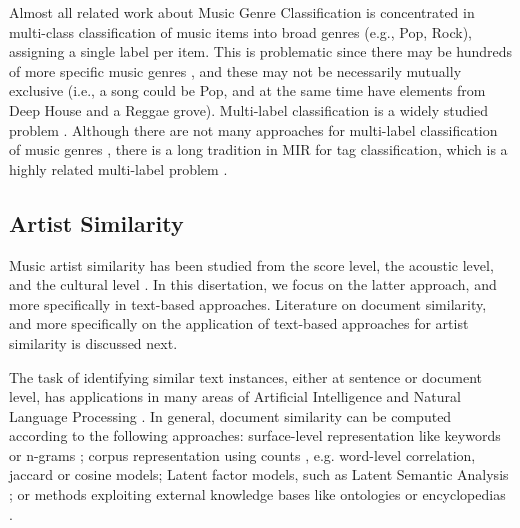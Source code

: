 Almost all related work about Music Genre Classification is concentrated in multi-class classification of music items into broad genres (e.g., Pop, Rock), assigning a single label per item. This is problematic since there may be hundreds of more specific music genres \citep{pachet2000taxonomy}, and these may not be necessarily mutually exclusive (i.e., a song could be Pop, and at the same time have elements from Deep House and a Reggae grove). 
Multi-label classification is a widely studied problem \citep{tsoumakas2006multi,jain2016extreme}. 
Although there are not many approaches for multi-label classification of music genres \citep{Sanden2011,wang2009tag}, there is a long tradition in MIR for tag classification, which is a highly related multi-label problem \citep{Choi2016,wang2009tag}.


\subsection{Artist Similarity}
\label{sec:SOA:mir:similarity}

Music artist similarity has been studied from the score level, the acoustic level, and the cultural level \citep{Ellis2002}. In this disertation, we focus on the latter approach, and more specifically in text-based approaches. Literature on document similarity, and more specifically on the application of text-based approaches for artist similarity is discussed next.

The task of identifying similar text instances, either at sentence or document level, has applications in many areas of Artificial Intelligence and Natural Language Processing \citep{LiuandWang2014}. In general, document similarity can be computed according to the following approaches: surface-level representation like keywords or n-grams \citep{ChimandDeng2008}; corpus representation using counts \citep{Rorvig1999}, e.g. word-level correlation, jaccard or cosine models; Latent factor models, such as Latent Semantic Analysis \citep{Deerwesteretal1990}; or methods exploiting external knowledge bases like ontologies or encyclopedias \citep{Huetal2009}.

